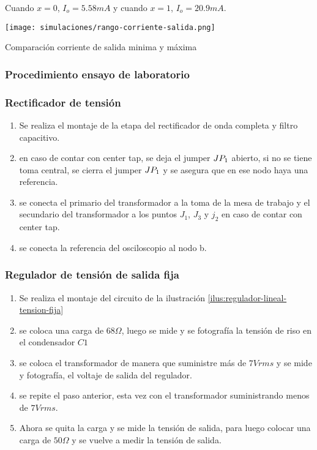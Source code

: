 Cuando $x=0$, $I_o = 5.58 mA$ y cuando $x=1$, $I_o = 20.9mA$.

\begin{ilustracion}[ht]
    \centering
    \texttt{[image: simulaciones/rango-corriente-salida.png]}
    \caption{Comparación corriente de salida minima y máxima}
    \label{ilus:rango-corriente-salida}
\end{ilustracion}

\subsubsection{Procedimiento ensayo de laboratorio}

\subsubsection*{Rectificador de tensión}

\begin{enumerate}
    \item Se realiza el montaje de la etapa del rectificador de onda completa y filtro capacitivo.
    \item en caso de contar con center tap, se deja el jumper $JP_{1}$ abierto, si no se tiene toma central, se cierra el jumper $JP_{1}$ y se asegura que en ese nodo haya una referencia.
    \item se conecta el primario del transformador a la toma de la mesa de trabajo y el secundario del transformador a los puntos $J_1$, $J_3$ y $j_2$ en caso de contar con center tap.
    \item se conecta la referencia del osciloscopio al nodo b.
\end{enumerate}

\subsubsection*{Regulador de tensión de salida fija}

\begin{enumerate}
    \item Se realiza el montaje del circuito de la ilustración \ref{ilus:regulador-lineal-tension-fija}
    \item se coloca una carga de $68 \Omega$, luego se mide y se fotografía la tensión de riso en el condensador $C1$ 
    \item se coloca el transformador de manera que suministre más de $7Vrms$ y se mide y fotografía, el voltaje de salida del regulador.
    \item se repite el paso anterior, esta vez con el transformador suministrando menos de $7Vrms$.
    \item Ahora se quita la carga y se mide la tensión de salida, para luego colocar una carga de $50 \Omega$ y se vuelve a medir la tensión de salida.
\end{enumerate}

